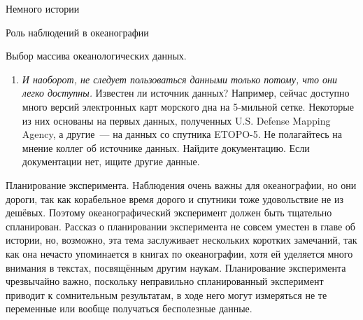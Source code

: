 \begin{chapter}{Немного истории}
\begin{section}{Роль наблюдений в океанографии}
\begin{paragraph}{Выбор массива океанологических данных.}
\begin{enumerate}
\item 
\emph{И наоборот, не следует пользоваться данными только потому, что они легко
доступны.} Известен ли источник данных? Например, сейчас доступно много
версий электронных карт морского дна на 5-мильной сетке. Некоторые из
них основаны на первых данных, полученных U.S. Defense Mapping Agency, а
другие~--- на данных со спутника ETOPO-5. Не полагайтесь на
мнение коллег об источнике данных. Найдите документацию. Если
документации нет, ищите другие данные.
%
\end{enumerate}
\end{paragraph}


\begin{paragraph}{Планирование эксперимента.}
Наблюдения очень важны для океанографии, но
они дороги, так как корабельное время дорого и спутники тоже
удовольствие не из дешёвых. Поэтому океанографический эксперимент
должен быть тщательно спланирован. Рассказ о планировании эксперимента не
совсем уместен в главе об истории, но, возможно, эта тема заслуживает
нескольких коротких замечаний, так как она нечасто упоминается в книгах
по океанографии, хотя ей уделяется много внимания в текстах, посвящённым
другим наукам. Планирование эксперимента чрезвычайно важно, поскольку
неправильно спланированный эксперимент приводит к сомнительным
результатам, в ходе него могут измеряться не те переменные или вообще
получаться бесполезные данные.
%



\end{paragraph}
\end{section}
\end{chapter}
